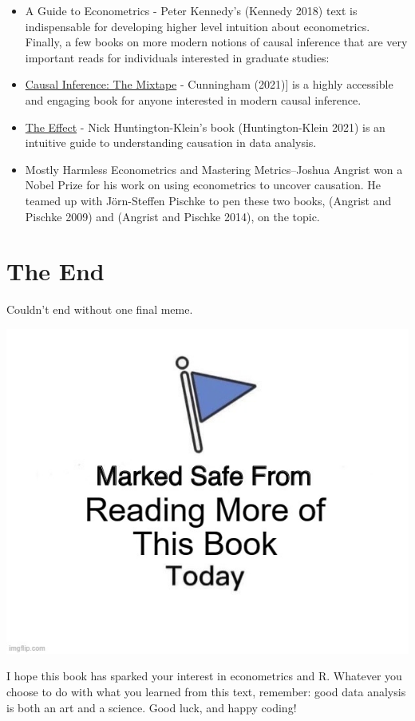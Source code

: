 \documentclass[
  letterpaper,
]{book}
\providecommand{\tightlist}{%
  \setlength{\itemsep}{0pt}\setlength{\parskip}{0pt}}\usepackage{longtable,booktabs,array}
\begin{document}
\begin{itemize}
\tightlist
\item
  A Guide to Econometrics - Peter Kennedy's (Kennedy 2018) text is
  indispensable for developing higher level intuition about
  econometrics. Finally, a few books on more modern notions of causal
  inference that are very important reads for individuals interested in
  graduate studies:
\item
  \href{https://mixtape.scunning.com/}{Causal Inference: The Mixtape} -
  Cunningham (2021){]} is a highly accessible and engaging book for
  anyone interested in modern causal inference.
\item
  \href{https://theeffectbook.net/}{The Effect} - Nick
  Huntington-Klein's book (Huntington-Klein 2021) is an intuitive guide
  to understanding causation in data analysis.
\item
  Mostly Harmless Econometrics and Mastering Metrics--Joshua Angrist won
  a Nobel Prize for his work on using econometrics to uncover causation.
  He teamed up with ‎Jörn-Steffen Pischke to pen these two books,
  (Angrist and Pischke 2009) and (Angrist and Pischke 2014), on the
  topic.
\end{itemize}

\section{The End}\label{the-end}

Couldn't end without one final meme.

\begin{center}
\includegraphics[width=0.5\linewidth,height=\textheight,keepaspectratio]{images/safe.jpg}
\end{center}

I hope this book has sparked your interest in econometrics and R.
Whatever you choose to do with what you learned from this text,
remember: good data analysis is both an art and a science. Good luck,
and happy coding!
\end{document}
